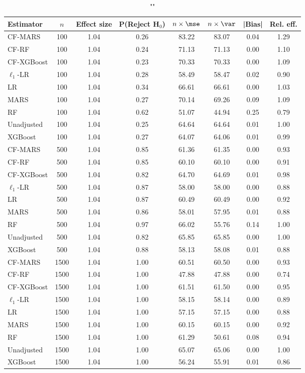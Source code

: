 
\begin{table}
\centering
\caption{""}
\begin{tabular}{lccccccc}
\toprule
Estimator & $n$ & Effect size & P(Reject H$_0$) & $n\times\mse$ & $n\times \var$ & |Bias| & Rel. eff.\\ \midrule
CF-MARS & 100 & 1.04 & 0.26 & 83.22 & 83.07 & 0.04 & 1.29 \\ 
CF-RF & 100 & 1.04 & 0.24 & 71.13 & 71.13 & 0.00 & 1.10 \\ 
CF-XGBoost & 100 & 1.04 & 0.23 & 70.33 & 70.33 & 0.00 & 1.09 \\ 
$\ell_1$-LR & 100 & 1.04 & 0.28 & 58.49 & 58.47 & 0.02 & 0.90 \\ 
LR & 100 & 1.04 & 0.34 & 66.61 & 66.61 & 0.00 & 1.03 \\ 
MARS & 100 & 1.04 & 0.27 & 70.14 & 69.26 & 0.09 & 1.09 \\ 
RF & 100 & 1.04 & 0.62 & 51.07 & 44.94 & 0.25 & 0.79 \\ 
Unadjusted & 100 & 1.04 & 0.25 & 64.64 & 64.64 & 0.01 & 1.00 \\ 
XGBoost & 100 & 1.04 & 0.27 & 64.07 & 64.06 & 0.01 & 0.99 \\ \addlinespace 
CF-MARS & 500 & 1.04 & 0.85 & 61.36 & 61.35 & 0.00 & 0.93 \\ 
CF-RF & 500 & 1.04 & 0.85 & 60.10 & 60.10 & 0.00 & 0.91 \\ 
CF-XGBoost & 500 & 1.04 & 0.82 & 64.70 & 64.69 & 0.01 & 0.98 \\ 
$\ell_1$-LR & 500 & 1.04 & 0.87 & 58.00 & 58.00 & 0.00 & 0.88 \\ 
LR & 500 & 1.04 & 0.87 & 60.49 & 60.49 & 0.00 & 0.92 \\ 
MARS & 500 & 1.04 & 0.86 & 58.01 & 57.95 & 0.01 & 0.88 \\ 
RF & 500 & 1.04 & 0.97 & 66.02 & 55.76 & 0.14 & 1.00 \\ 
Unadjusted & 500 & 1.04 & 0.82 & 65.85 & 65.85 & 0.00 & 1.00 \\ 
XGBoost & 500 & 1.04 & 0.88 & 58.13 & 58.08 & 0.01 & 0.88 \\ \addlinespace 
CF-MARS & 1500 & 1.04 & 1.00 & 60.51 & 60.50 & 0.00 & 0.93 \\ 
CF-RF & 1500 & 1.04 & 1.00 & 47.88 & 47.88 & 0.00 & 0.74 \\ 
CF-XGBoost & 1500 & 1.04 & 1.00 & 61.51 & 61.50 & 0.00 & 0.95 \\ 
$\ell_1$-LR & 1500 & 1.04 & 1.00 & 58.15 & 58.14 & 0.00 & 0.89 \\ 
LR & 1500 & 1.04 & 1.00 & 57.15 & 57.15 & 0.00 & 0.88 \\ 
MARS & 1500 & 1.04 & 1.00 & 60.15 & 60.15 & 0.00 & 0.92 \\ 
RF & 1500 & 1.04 & 1.00 & 61.29 & 50.61 & 0.08 & 0.94 \\ 
Unadjusted & 1500 & 1.04 & 1.00 & 65.07 & 65.06 & 0.00 & 1.00 \\ 
XGBoost & 1500 & 1.04 & 1.00 & 56.24 & 55.91 & 0.01 & 0.86 \\
\bottomrule
\end{tabular}
\end{table}


